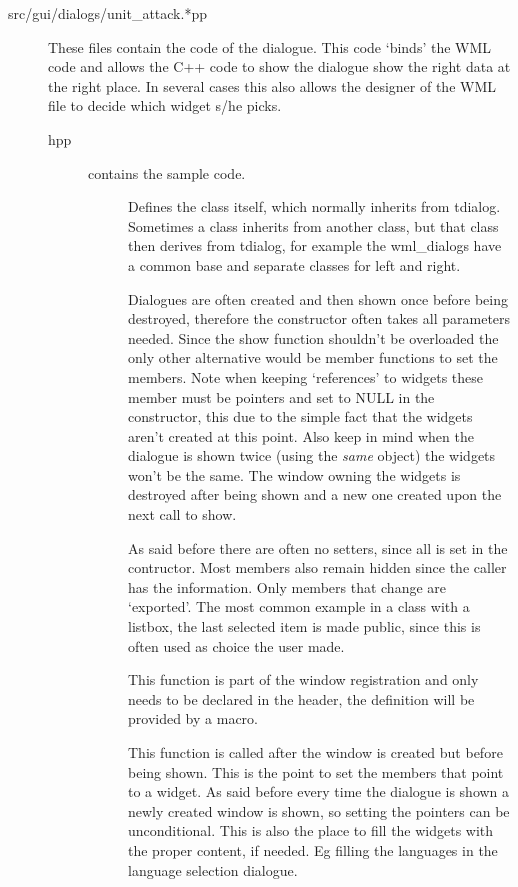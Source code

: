 \begin{description}

\item[src/gui/dialogs/unit\_attack.*pp]
	These files contain the code of the dialogue. This code `binds' the WML
	code and allows the C++ code to show the dialogue show the right data at the
	right place. In several cases this also allows the designer of the WML file
	to decide which widget s/he picks.

\begin{description}
\item[hpp]  contains the sample code. 
	\begin{description}
	\item[]
		Defines the class itself, which normally inherits from tdialog.
		Sometimes a class inherits from another class, but that class then
derives from tdialog, for example the wml\_dialogs have a common base and
separate classes for left and right.

	\item[]
		Dialogues are often created and then shown once before being destroyed,
therefore the constructor often takes all parameters needed. Since the show
function shouldn't be overloaded the only other alternative would be member
functions to set the members. Note when keeping `references' to widgets these
member must be pointers and set to NULL in the constructor, this due to the
simple fact that the widgets aren't created at this point. Also keep in mind
when
the dialogue is shown twice (using the \emph{same} object) the widgets won't be
the same. The window owning the widgets is destroyed after being shown and
a new one created upon the next call to show.

	\item[]
		As said before there are often no setters, since all is set in the
contructor. Most members also remain hidden since the caller has the
information. Only members that change are `exported'. The most common example in
a class with a listbox, the last selected item is made public, since this is
often used as choice the user made.

	\item[]
		This function is part of the window registration and only needs to be
declared in the header, the definition will be provided by a macro.

	\item[]
		This function is called after the window is created but before being
shown. This is the point to set the members that point to a widget. As said
before every time the dialogue is shown a newly created window is shown, so
setting the pointers can be unconditional. This is also the place to fill the
widgets with the proper content, if needed. Eg filling the languages in the
language selection dialogue.


\end{description}
\end{description}
\end{description}
